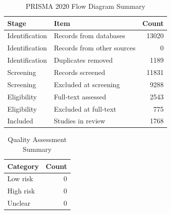 \begin{table}[htbp]
\centering
\caption{PRISMA 2020 Flow Diagram Summary}
\begin{tabular}{llr}
\hline
Stage & Item & Count \\
\hline
Identification & Records from databases & 13020 \\
Identification & Records from other sources & 0 \\
Identification & Duplicates removed & 1189 \\
Screening & Records screened & 11831 \\
Screening & Excluded at screening & 9288 \\
Eligibility & Full-text assessed & 2543 \\
Eligibility & Excluded at full-text & 775 \\
Included & Studies in review & 1768 \\
\hline
\end{tabular}
\end{table}

\begin{table}[htbp]
\centering
\caption{Quality Assessment Summary}
\begin{tabular}{lr}
\hline
Category & Count \\
\hline
Low risk & 0 \\
High risk & 0 \\
Unclear & 0 \\
\hline
\end{tabular}
\end{table}
